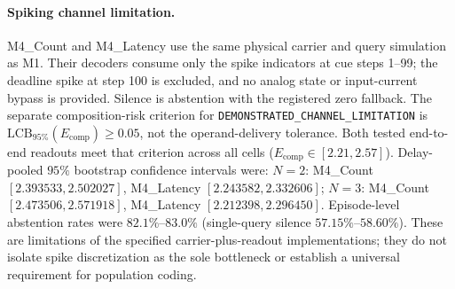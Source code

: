 \documentclass{article}
\begin{document}
\paragraph{Spiking channel limitation.}
M4\_Count and M4\_Latency use the same physical carrier and query simulation
as M1. Their decoders consume only the spike indicators at cue steps
1--99; the deadline spike at step 100 is excluded, and no analog state
or input-current bypass is provided. Silence is abstention with the
registered zero fallback. The separate composition-risk criterion for
\texttt{DEMONSTRATED\_CHANNEL\_LIMITATION} is
$\mathrm{LCB}_{95\%}(E_{\mathrm{comp}})\ge0.05$, not the operand-delivery
tolerance. Both tested end-to-end readouts meet that criterion across
all cells ($E_{\mathrm{comp}}\in[2.21,2.57]$).
Delay-pooled $95\%$ bootstrap confidence intervals were:
$N=2$: M4\_Count $[2.393533,2.502027]$, M4\_Latency $[2.243582,2.332606]$;
$N=3$: M4\_Count $[2.473506,2.571918]$, M4\_Latency $[2.212398,2.296450]$.
Episode-level abstention rates were $82.1\%$--$83.0\%$
(single-query silence $57.15\%$--$58.60\%$).
These are limitations of the specified carrier-plus-readout implementations;
they do not isolate spike discretization as the sole bottleneck or establish
a universal requirement for population coding.
\end{document}
